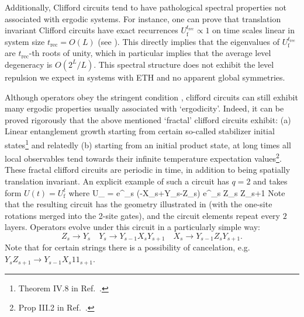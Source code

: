 \documentclass[aps,prb,twocolumn,superscriptaddress]{revtex4-1}
\begin{document}
Additionally, Clifford circuits tend to have pathological spectral properties not associated with ergodic systems. For instance, one can prove that translation invariant Clifford circuits have exact recurrences $U^{t_\text{rec}}_\text{f} \propto1$ on time scales linear in system size $t_\text{rec} = O(L)$ (see ). This directly implies that the eigenvalues of $U^{t_\text{rec}}_\text{f} $  are $t_{\text{rec}}$-th roots of unity, which in particular implies that the average level degeneracy is $O(2^L/L)$. This spectral structure does not exhibit the level repulsion we expect in systems with ETH and no apparent global symmetries.

Although operators obey the  stringent condition , clifford circuits can still exhibit many  ergodic properties usually associated with `ergodicity'. Indeed, it can be proved rigorously that  the above mentioned `fractal' clifford circuits exhibit: (a) Linear entanglement growth starting from certain so-called stabilizer initial states\footnote{Theorem IV.8 in Ref.~.} and relatedly (b) starting from an initial product state, at long times all local observables tend towards their infinite temperature expectation values\footnote{Prop III.2 in Ref.~.}.  These fractal clifford circuits are periodic in time, in addition to being spatially translation invariant. An explicit example of such a circuit has $q=2$ and takes form $U(t)=U_{\text{f}}^t$ where
\be\label{eq:fractalClifford}
U_ = e^{\sum_s (-X_s+Y_s-Z_s)} e^{\sum_{s} Z_s Z_{s+1}} 
\ee
Note that the resulting circuit has the geometry illustrated in  (with the one-site rotations merged into the 2-site gates), and the circuit elements repeat every $2$ layers. Operators evolve under this circuit in a particularly simple way:
\begin{equation}\label{eq:Clifford_op_spread}
Z_s\to Y_s \quad Y_s\to Y_{s-1}X_{s}Y_{s+1}\quad X_{s}\to Y_{s-1}Z_{s}Y_{s+1}.
\end{equation} 
Note that for certain strings there is a possibility of cancelation, e.g. $Y_s Z_{s+1} \to Y_{s-1}X_{s}1\!\!1_{s+1}$.
\end{document}
